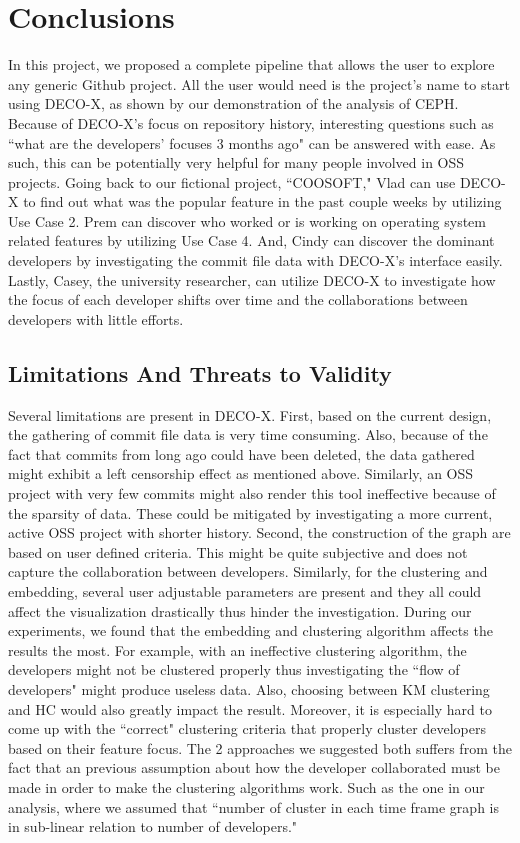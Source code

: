 \documentclass{article}
\begin{document}
\section{Conclusions}
In this project, we proposed a complete pipeline that allows the user to explore any generic Github project. All the user would need is the project's name to start using DECO-X, as shown by our demonstration of the analysis of CEPH. Because of DECO-X's focus on repository history, interesting questions such as ``what are the developers' focuses 3 months ago" can be answered with ease. As such, this can be potentially very helpful for many people involved in OSS projects. Going back to our fictional project, ``COOSOFT," Vlad can use DECO-X to find out what was the popular feature in the past couple weeks by utilizing Use Case 2. Prem can discover who worked or is working on operating system related features by utilizing Use Case 4. And, Cindy can discover the dominant developers by investigating the commit file data with DECO-X's interface easily. Lastly, Casey, the university researcher, can utilize DECO-X to investigate how the focus of each developer shifts over time and the collaborations between developers with little efforts.
\subsection{Limitations And Threats to Validity}
Several limitations are present in DECO-X. First, based on the current design, the gathering of commit file data is very time consuming. Also, because of the fact that commits from long ago could have been deleted, the data gathered might exhibit a left censorship effect as mentioned above. Similarly, an OSS project with very few commits might also render this tool ineffective because of the sparsity of data. These could be mitigated by investigating a more current, active OSS project with shorter history. Second, the construction of the graph are based on user defined criteria. This might be quite subjective and does not capture the collaboration between developers. Similarly, for the clustering and embedding, several user adjustable parameters are present and they all could affect the visualization drastically thus hinder the investigation. During our experiments, we found that the embedding and clustering algorithm affects the results the most. For example, with an ineffective clustering algorithm, the developers might not be clustered properly thus investigating the ``flow of developers" might produce useless data. Also, choosing between KM clustering and HC would also greatly impact the result. Moreover, it is especially hard to come up with the ``correct" clustering criteria that properly cluster developers based on their feature focus. The 2 approaches we suggested both suffers from the fact that an previous assumption about how the developer collaborated must be made in order to make the clustering algorithms work. Such as the one in our analysis, where we assumed that ``number of cluster in each time frame graph is in sub-linear relation to number of developers."
\end{document}
